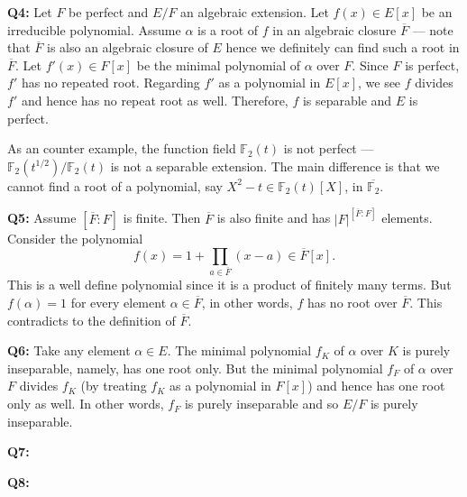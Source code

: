 \documentclass[12pt,a4paper]{article}
\def\FF{\mathbb{F}}
\def\aa{\alpha}
\begin{document}
\bigskip

\noindent\textbf{Q4:}
Let $F$ be perfect and $E/F$ an algebraic extension. Let $f(x) \in E[x]$ be an irreducible polynomial. Assume $\aa$ is a root of $f$ in an algebraic closure $\overline{F}$ ---  note that $\overline{F}$ is also an algebraic closure of $E$ hence we definitely can find such a root in $\overline{F}$. Let $f'(x)\in F[x]$ be the minimal polynomial of $\aa$ over $F$. Since $F$ is perfect, $f'$ has no repeated root. Regarding $f'$ as a polynomial in $E[x]$, we see $f$ divides $f'$ and hence has no repeat root as well. Therefore, $f$ is separable and $E$ is perfect.


As an counter example, the function field $\FF_2(t)$ is not perfect --- $\FF_2(t^{1/2})/\FF_2(t)$ is not a separable extension. The main difference is that we cannot find a root of a polynomial, say $X^2-t \in \FF_2(t)[X]$, in $\overline{\FF_2}$.

\bigskip

\noindent\textbf{Q5:} Assume $[\overline{F}:F]$ is finite. Then $\overline{F}$ is also finite and has $|F|^{[\overline{F}:F]}$ elements. Consider the polynomial $$f(x)=1+\prod_{a\in\overline{F}} (x-a) \in \overline{F}[x].$$ This is a well define polynomial since it is a product of finitely many terms. But $f(\aa)=1$ for every element $\aa\in \overline{F}$, in other words, $f$ has no root over $\overline{F}$. This contradicts to the definition of $\overline{F}$.


\bigskip

\noindent\textbf{Q6:}
Take any element $\aa\in E$. The minimal polynomial $f_K$ of $\aa$ over $K$ is purely inseparable, namely, has one root only. But the minimal polynomial $f_F$ of $\aa$ over $F$ divides $f_K$ (by treating $f_K$ as a polynomial in $F[x]$) and hence has one root only as well. In other words, $f_F$ is purely inseparable and so $E/F$ is purely inseparable.

\bigskip

\noindent\textbf{Q7:}

\bigskip

\noindent\textbf{Q8:}
\end{document}
